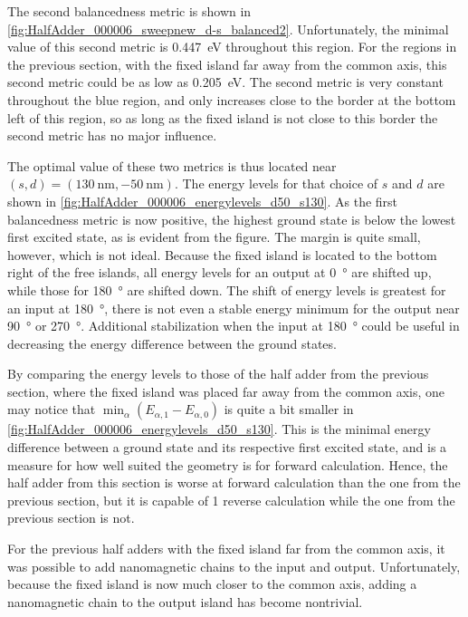 \documentclass[11pt,a4paper,english]{article}
\begin{document}
The second balancedness metric is shown in \cref{fig:HalfAdder_000006_sweepnew_d-s_balanced2}. Unfortunately, the minimal value of this second metric is \SI{0.447}{\electronvolt} throughout this region. For the regions in the previous section, with the fixed island far away from the common axis, this second metric could be as low as \SI{0.205}{\electronvolt}. The second metric is very constant throughout the blue region, and only increases close to the border at the bottom left of this region, so as long as the fixed island is not close to this border the second metric has no major influence. \par
The optimal value of these two metrics is thus located near $(s,d)=(\SI{130}{\nano\metre}, \SI{-50}{\nano\metre})$. The energy levels for that choice of $s$ and $d$ are shown in \cref{fig:HalfAdder_000006_energylevels_d50_s130}. As the first balancedness metric is now positive, the highest ground state is below the lowest first excited state, as is evident from the figure. The margin is quite small, however, which is not ideal. Because the fixed island is located to the bottom right of the free islands, all energy levels for an output at \SI{0}{\degree} are shifted up, while those for \SI{180}{\degree} are shifted down. The shift of energy levels is greatest for an input at \SI{180}{\degree}, there is not even a stable energy minimum for the output near \SI{90}{\degree} or \SI{270}{\degree}. Additional stabilization when the input at \SI{180}{\degree} could be useful in decreasing the energy difference between the ground states. \par
By comparing the energy levels to those of the half adder from the previous section, where the fixed island was placed far away from the common axis, one may notice that $\min_\alpha(E_{\alpha,1}-E_{\alpha,0})$ is quite a bit smaller in \cref{fig:HalfAdder_000006_energylevels_d50_s130}. This is the minimal energy difference between a ground state and its respective first excited state, and is a measure for how well suited the geometry is for forward calculation. Hence, the half adder from this section is worse at forward calculation than the one from the previous section, but it is capable of 1 reverse calculation while the one from the previous section is not. \par %
For the previous half adders with the fixed island far from the common axis, it was possible to add nanomagnetic chains to the input and output. Unfortunately, because the fixed island is now much closer to the common axis, adding a nanomagnetic chain to the output island has become nontrivial.
\end{document}
